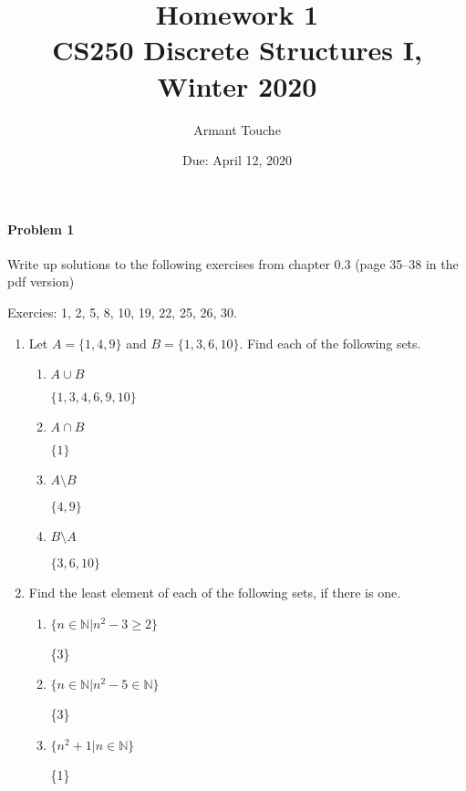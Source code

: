 \documentclass[11pt, a4paper]{article}
\title{\bf Homework 1\\[1ex]
\rm\normalsize CS250 Discrete Structures I, Winter 2020 }
\date{\normalsize Due: April 12, 2020}
\author{\normalsize Armant Touche}
\begin{document}
 

\vspace{0cm}\maketitle 

\paragraph{Problem 1} Write up solutions to the following exercises from chapter 0.3 (page 35–38 in the pdf version)

Exercies: 1, 2, 5, 8, 10, 19, 22, 25, 26, 30.

\begin{enumerate}

    \item Let $A = \{1,4,9\}$ and $B = \{1,3,6,10\}$. Find each of the following sets.
        \begin{enumerate}
            \item $A\cup B$

                $\{1,3,4,6,9,10\}$

            \item $A\cap B$

                $\{1\}$

            \item $A\setminus B$

                $\{4,9\}$

            \item $B\setminus A$

                $\{3,6,10\}$

        \end{enumerate}

    \item Find the least element of each of the following sets, if there is one.
        \begin{enumerate}
            \item $\{n \in\mathbb{N}| n^2 - 3 \geq 2\}$
                
                \{3\}

            \item $\{n \in\mathbb{N}| n^2 - 5 \in \mathbb{N}\}$

                \{3\}

            \item $\{n^2 + 1| n \in\mathbb{N}\}$

                \{1\}


\end{enumerate}
\end{enumerate}
\end{document}

